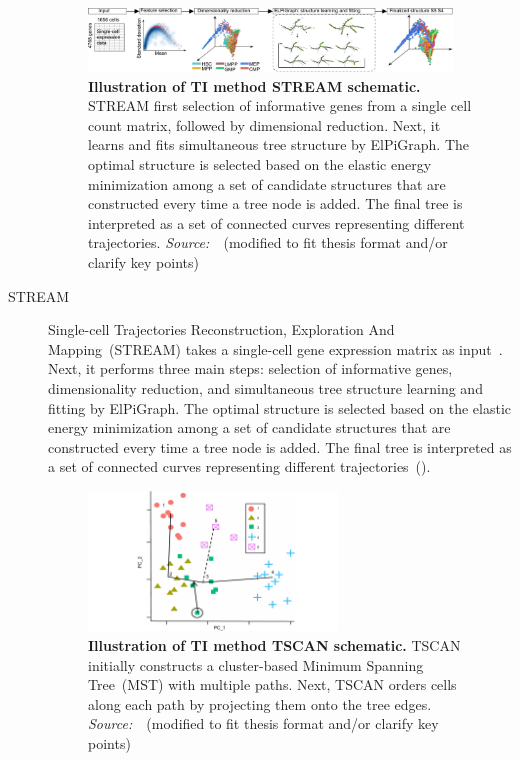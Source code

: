 \begin{description}
\begin{figure}[h!]
  	\centering
  	\includegraphics[width=0.95\textwidth]{TI_Alg_STREAM/fig}
  	\vspace{0.1cm}
  	\caption[Illustration of TI method STREAM schematic.]{\textbf{Illustration of TI method STREAM schematic.} STREAM first selection of informative genes from a single cell count matrix, followed by dimensional reduction. Next, it learns and fits simultaneous tree structure by ElPiGraph. The optimal structure is selected based on the elastic energy minimization among a set of candidate structures that are constructed every time a tree node is added. The final tree is interpreted as a set of connected curves representing different trajectories. \emph{Source:~\cite{chen2019stream}}~(modified to fit thesis format and/or clarify key points)
  	}
  	\label{fig:TI_Alg_STREAM}
\end{figure}

  \item[STREAM]
  Single-cell Trajectories Reconstruction, Exploration And Mapping~(STREAM) takes a single-cell gene expression matrix as input~\citep{chen2019stream}. Next, it performs three main steps: selection of informative genes, dimensionality reduction, and simultaneous tree structure learning and fitting by ElPiGraph. The optimal structure is selected based on the elastic energy minimization among a set of candidate structures that are constructed every time a tree node is added. The final tree is interpreted as a set of connected curves representing different trajectories~().

\begin{figure}[h!]
  	\centering
  	\includegraphics[width=0.65\textwidth]{TI_Alg_TSCAN/fig}
  	\vspace{0.1cm}
  	\caption[Illustration of TI method TSCAN schematic.]{\textbf{Illustration of TI method TSCAN schematic.}
  	TSCAN initially constructs a cluster-based Minimum Spanning Tree~(MST) with multiple paths. Next, TSCAN orders cells along each path by projecting them onto the tree edges. \emph{Source:~\cite{ji2016tscan}}~(modified to fit thesis format and/or clarify key points)
  	}
  	\label{fig:TI_Alg_TSCAN}
\end{figure}


\end{description}
